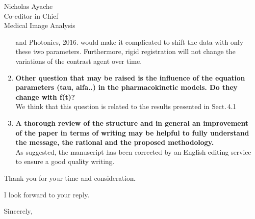 \documentclass{letter}
\begin{document}
\begin{letter}{Nicholas Ayache \\ Co-editor in Chief \\ Medical Image Analysis}
\begin{enumerate}
    and Photonics, 2016. would make it complicated to shift the data
    with only these two parameters. Furthermore, rigid registration
    will not change the variations of the contrast agent over time.
  \item \textbf{Other question that may be raised is the influence of
      the equation parameters (tau, alfa..) in the pharmacokinetic
      models. Do they change with f(t)?}\\
    We think that this question is related to the results presented in
    Sect.\,4.1
  \item \textbf{A thorough review of the structure and in general an
      improvement of the paper in terms of writing may be helpful to
      fully understand the message, the rational and the proposed
      methodology.}\\
    As suggested, the manuscript has been corrected by an English editing
    service to ensure a good quality writing.
  \end{enumerate}

  Thank you for your time and consideration.

  I look forward to your reply.

  \vspace{2\parskip} %
  \closing{Sincerely,}
  \vspace{2\parskip} %


\end{letter}
\end{document}
